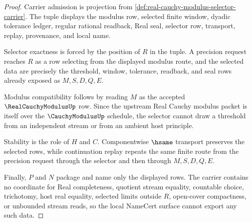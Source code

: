 \begin{proof}
Carrier admission is projection from \autoref{def:real-cauchy-modulus-selector-carrier}. The tuple displays the modulus row, selected finite window, dyadic tolerance ledger, regular rational readback, Real seal, selector row, transport, replay, provenance, and local name.

Selector exactness is forced by the position of $R$ in the tuple. A precision request reaches $R$ as a row selecting from the displayed modulus route, and the selected data are precisely the threshold, window, tolerance, readback, and seal rows already exposed as $M,S,D,Q,E$.

Modulus compatibility follows by reading $M$ as the accepted $\RealCauchyModulusUp$ row. Since the upstream Real Cauchy modulus packet is itself over the $\CauchyModulusUp$ schedule, the selector cannot draw a threshold from an independent stream or from an ambient host principle.

Stability is the role of $H$ and $C$. Componentwise $\hsame$ transport preserves the selected rows, while continuation replay repeats the same finite route from the precision request through the selector and then through $M,S,D,Q,E$.

Finally, $P$ and $N$ package and name only the displayed rows. The carrier contains no coordinate for Real completeness, quotient stream equality, countable choice, trichotomy, host real equality, selected limits outside $R$, open-cover compactness, or unbounded stream reads, so the local NameCert surface cannot export any such data.
\end{proof}

